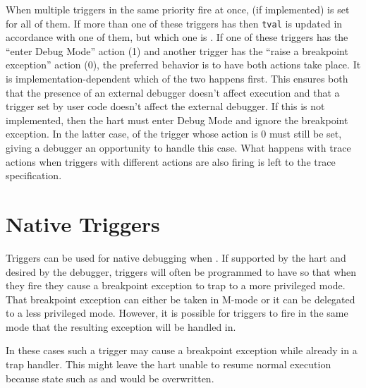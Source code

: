 When multiple triggers in the same priority fire at once, \FcsrMcontrolHit (if
implemented) is set for all of them.  If more than one of these triggers has
 then {\tt tval} is updated in accordance with one of
them, but which one is \unspecified.  If one of these triggers has
the ``enter Debug Mode'' action (1) and another
trigger has the ``raise a breakpoint exception'' action (0),
the preferred behavior is to have both actions take place.  It is
implementation-dependent which of the two happens first.  This ensures both
that the presence of an external debugger doesn't affect execution and that a
trigger set by user code doesn't affect the external debugger. If this is not
implemented, then the hart must enter Debug Mode and ignore the breakpoint
exception. In the latter case, \FcsrMcontrolHit of the trigger whose action is 0 must still
be set, giving a debugger an opportunity to handle this case. What happens with
trace actions when triggers with different actions are also firing is left to
the trace specification.

\section{Native Triggers}
\label{sec:nativetrigger}

Triggers can be used for native debugging when .
If supported by the hart and desired by the debugger, triggers will often be
programmed to have  so that when they fire they cause a
breakpoint exception to trap to a more privileged mode. That breakpoint
exception can either be taken in M-mode or it can be delegated to a less
privileged mode. However, it is possible for triggers to fire in the same
mode that the resulting exception will be handled in.

In these cases such a trigger may cause a breakpoint exception while already
in a trap handler. This might leave the hart unable to resume normal execution
because state such as \Rmcause and \Rmepc would be overwritten.

